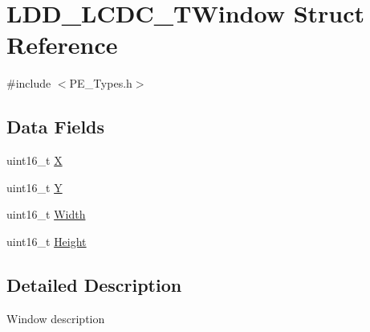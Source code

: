 \hypertarget{struct_l_d_d___l_c_d_c___t_window}{\section{L\-D\-D\-\_\-\-L\-C\-D\-C\-\_\-\-T\-Window Struct Reference}
\label{struct_l_d_d___l_c_d_c___t_window}
}


{\ttfamily \#include $<$P\-E\-\_\-\-Types.\-h$>$}

\subsection*{Data Fields}
\begin{DoxyCompactItemize}
\item 
uint16\-\_\-t \hyperlink{struct_l_d_d___l_c_d_c___t_window_a9dd1270e9794b4dbd79b2b30afca87c9}{X}
\item 
uint16\-\_\-t \hyperlink{struct_l_d_d___l_c_d_c___t_window_af64f532d1fb5899c563ba40df90867d8}{Y}
\item 
uint16\-\_\-t \hyperlink{struct_l_d_d___l_c_d_c___t_window_a53ee53813f5884a400be8ca3093233c4}{Width}
\item 
uint16\-\_\-t \hyperlink{struct_l_d_d___l_c_d_c___t_window_abe1dbefb6d43373336fa414b88a79cc2}{Height}
\end{DoxyCompactItemize}


\subsection{Detailed Description}
Window description 

